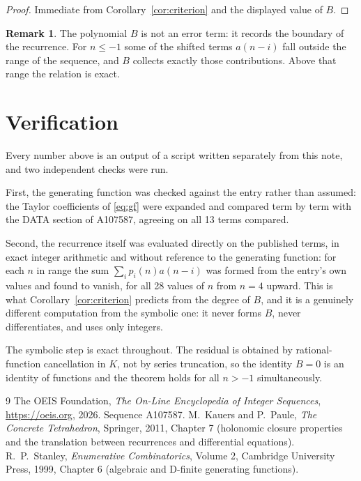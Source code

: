 \documentclass[11pt,a4paper]{article}
\theoremstyle{plain}
\theoremstyle{definition}
\newtheorem{remark}[theorem]{Remark}
\begin{document}
\begin{proof}
Immediate from Corollary~\ref{cor:criterion} and the displayed value of $B$.
\end{proof}

\begin{remark}
The polynomial $B$ is not an error term: it records the boundary of the recurrence. For
$n\le-1$ some of the shifted terms $a(n-i)$ fall outside the range of the sequence,
and $B$ collects exactly those contributions. Above that range the relation is exact.
\end{remark}

\section{Verification}

Every number above is an output of a script written separately from this note, and two
independent checks were run.

First, the generating function was checked against the entry rather than assumed: the
Taylor coefficients of \eqref{eq:gf} were expanded and compared term by term with the DATA
section of A107587, agreeing on all 13 terms compared.

Second, the recurrence itself was evaluated directly on the published terms, in exact
integer arithmetic and without reference to the generating function: for each $n$ in range
the sum $\sum_{i}p_{i}(n)a(n-i)$ was formed from the entry's own values and found to
vanish, for all 28 values of $n$ from $n=4$ upward. This is what
Corollary~\ref{cor:criterion} predicts from the degree of $B$, and it is a genuinely
different computation from the symbolic one: it never forms $B$, never differentiates, and
uses only integers.

The symbolic step is exact throughout. The residual is obtained by rational-function
cancellation in $K$, not by series truncation, so the identity $B=0$ is an
identity of functions and the theorem holds for all $n>-1$ simultaneously.

\begin{thebibliography}{9}
 The OEIS Foundation, \emph{The On-Line Encyclopedia of Integer Sequences},
\url{https://oeis.org}, 2026. Sequence A107587.
 M.~Kauers and P.~Paule, \emph{The Concrete Tetrahedron}, Springer, 2011,
Chapter 7 (holonomic closure properties and the translation between recurrences and
differential equations).
 R.~P.~Stanley, \emph{Enumerative Combinatorics}, Volume 2, Cambridge
University Press, 1999, Chapter 6 (algebraic and D-finite generating functions).
\end{thebibliography}
\end{document}
